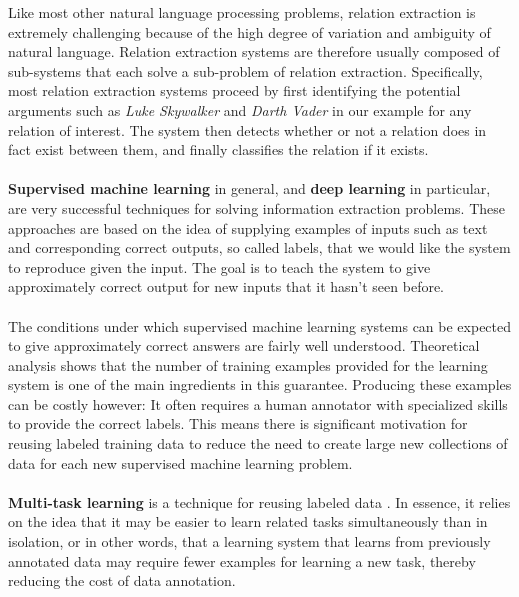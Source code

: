Like most other natural language processing problems, relation extraction is extremely challenging because of the high degree of variation and ambiguity of natural language. Relation extraction systems are therefore usually composed of sub-systems that each solve a sub-problem of relation extraction. Specifically, most relation extraction systems proceed by first identifying the potential arguments such as \textit{Luke Skywalker} and \textit{Darth Vader} in our example for any relation of interest. The system then detects whether or not a relation does in fact exist between them, and finally classifies the relation if it exists.
\\\\
\textbf{Supervised machine learning} in general, and \textbf{deep learning} in particular, are very successful techniques for solving information extraction problems. These approaches are based on the idea of supplying examples of inputs such as text and corresponding correct outputs, so called labels, that we would like the system to reproduce given the input. The goal is to teach the system to give approximately correct output for new inputs that it hasn't seen before.
\\\\
The conditions under which supervised machine learning systems can be expected to give approximately correct answers are fairly well understood. Theoretical analysis shows that the number of training examples provided for the learning system is one of the main ingredients in this guarantee. Producing these examples can be costly however: It often requires a human annotator with specialized skills to provide the correct labels. This means there is significant motivation for reusing labeled training data to reduce the need to create large new collections of data for each new supervised machine learning problem.
\\\\
\textbf{Multi-task learning} is a technique for reusing labeled data \citep{caruana1997}. In essence, it relies on the idea that it may be easier to learn related tasks simultaneously than in isolation, or in other words, that a learning system that learns from previously annotated data may require fewer examples for learning a new task, thereby reducing the cost of data annotation.